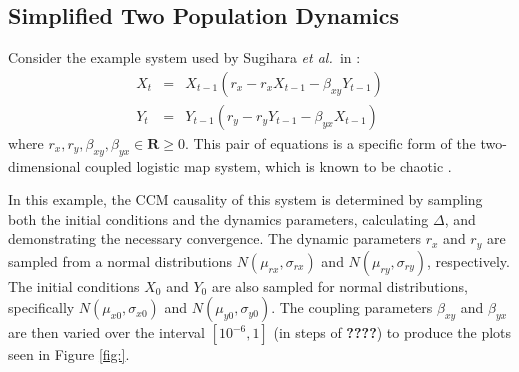 \documentclass[a4paper,11pt]{article}
\begin{document}
\subsection{Simplified Two Population Dynamics}
\label{sec:2Pop}
Consider the example system used by Sugihara {\em et al.\ }in \cite{Sugihara2012}:
\begin{eqnarray}
\label{eqn:2pop}
X_t &=& X_{t-1}\left(r_x-r_x X_{t-1}-\beta_{xy} Y_{t-1}\right)\\
Y_t &=& Y_{t-1}\left(r_y-r_y Y_{t-1}-\beta_{yx} X_{t-1}\right)
\end{eqnarray}
where $r_x,r_y,\beta_{xy},\beta_{yx}\in\mathbf{R}\ge 0$.  This pair of equations is a specific form of the two-dimensional coupled logistic map system, which is known to be chaotic \cite{Lloyd1995}.

In this example, the CCM causality of this system is determined by sampling both the initial conditions and the dynamics parameters, calculating $\Delta$, and demonstrating the necessary convergence.  The dynamic parameters $r_x$ and $r_y$ are sampled from a normal distributions $N\left(\mu_{rx},\sigma_{rx}\right)$ and $N\left(\mu_{ry},\sigma_{ry}\right)$, respectively.  The initial conditions $X_0$ and $Y_0$ are also sampled for normal distributions, specifically $N\left(\mu_{x0},\sigma_{x0}\right)$ and $N\left(\mu_{y0},\sigma_{y0}\right)$.  The coupling parameters $\beta_{xy}$ and $\beta_{yx}$ are then varied over the interval $[10^{-6},1]$ (in steps of {\bf ????}) to produce the plots seen in Figure \ref{fig:}.
\end{document}
